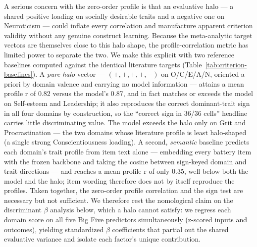 \documentclass[11pt]{article}
\begin{document}
A serious concern with the zero-order profile is that an evaluative halo — a shared positive loading on socially desirable traits and a negative one on Neuroticism — could inflate every correlation and manufacture apparent criterion validity without any genuine construct learning. Because the meta-analytic target vectors are themselves close to this halo shape, the profile-correlation metric has limited power to separate the two. We make this explicit with two reference baselines computed against the identical literature targets (Table~\ref{tab:criterion-baselines}). A \emph{pure halo} vector — $(+,+,+,+,-)$ on O/C/E/A/N, oriented a priori by domain valence and carrying no model information — attains a mean profile r of 0.82 versus the model's 0.87, and in fact matches or exceeds the model on Self-esteem and Leadership; it also reproduces the correct dominant-trait sign in all four domains by construction, so the ``correct sign in 36/36 cells'' headline carries little discriminating value. The model exceeds the halo only on Grit and Procrastination — the two domains whose literature profile is least halo-shaped (a single strong Conscientiousness loading). A second, \emph{semantic} baseline predicts each domain's trait profile from item text alone — embedding every battery item with the frozen backbone and taking the cosine between sign-keyed domain and trait directions — and reaches a mean profile r of only 0.35, well below both the model and the halo; item wording therefore does not by itself reproduce the profiles. Taken together, the zero-order profile correlation and the sign test are necessary but not sufficient. We therefore rest the nomological claim on the discriminant $\beta$ analysis below, which a halo cannot satisfy: we regress each domain score on all five Big Five predictors simultaneously (z-scored inputs and outcomes), yielding standardized $\beta$ coefficients that partial out the shared evaluative variance and isolate each factor's unique contribution.
\end{document}
